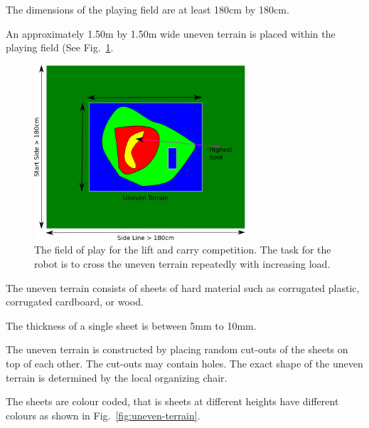 \documentclass[12pt]{hurocup}
\begin{document}
\begin{lawlist}[LC]

\item The dimensions of the playing field are at least 180cm by
  180cm.

\item An approximately 1.50m by 1.50m wide uneven terrain is placed
  within the playing field (See Fig.~\ref{fig:lift-and-carry-field}.

  \begin{figure}
    \begin{center}
      \includegraphics[width=0.7\textwidth]{Figures/lift-and-carry}
    \end{center}
    \caption{The field of play for the lift and carry competition. The
      task for the robot is to cross the uneven terrain repeatedly with
      increasing load.}
    \label{fig:lift-and-carry-field}
  \end{figure}

\item The uneven terrain consists of sheets of hard material such as
corrugated plastic, corrugated cardboard, or wood. 

\item The thickness of a single sheet is between 5mm to 10mm.

\item The uneven terrain is constructed by placing random cut-outs of
the sheets on top of each other. The cut-outs may contain holes.  The
exact shape of the uneven terrain is determined by the local
organizing chair.

\item The sheets are colour coded, that is sheets at different heights
have different colours as shown in Fig.~\ref{fig:uneven-terrain}.


\end{lawlist}
\end{document}
